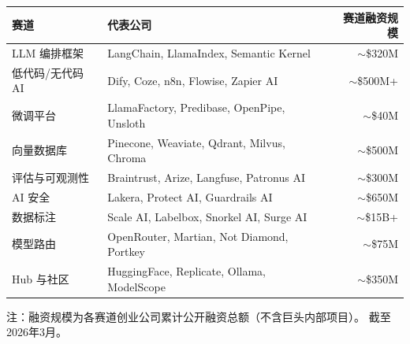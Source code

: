 \begin{keybox}
\small
\begin{tabularx}{\textwidth}{l X r}
\toprule
\rowcolor{figLightGray}
\textbf{赛道} & \textbf{代表公司} & \textbf{赛道融资规模} \\
\midrule
LLM 编排框架     & LangChain, LlamaIndex, Semantic Kernel & $\sim$\$320M \\
低代码/无代码 AI & Dify, Coze, n8n, Flowise, Zapier AI     & $\sim$\$500M+ \\
微调平台         & LlamaFactory, Predibase, OpenPipe, Unsloth & $\sim$\$40M \\
向量数据库       & Pinecone, Weaviate, Qdrant, Milvus, Chroma & $\sim$\$500M \\
评估与可观测性   & Braintrust, Arize, Langfuse, Patronus AI    & $\sim$\$300M \\
AI 安全          & Lakera, Protect AI, Guardrails AI            & $\sim$\$650M \\
数据标注         & Scale AI, Labelbox, Snorkel AI, Surge AI     & $\sim$\$15B+ \\
模型路由         & OpenRouter, Martian, Not Diamond, Portkey    & $\sim$\$75M \\
Hub 与社区       & HuggingFace, Replicate, Ollama, ModelScope   & $\sim$\$350M \\
\bottomrule
\end{tabularx}

\medskip
\noindent 注：融资规模为各赛道创业公司累计公开融资总额（不含巨头内部项目）。
截至2026年3月。
\end{keybox}

